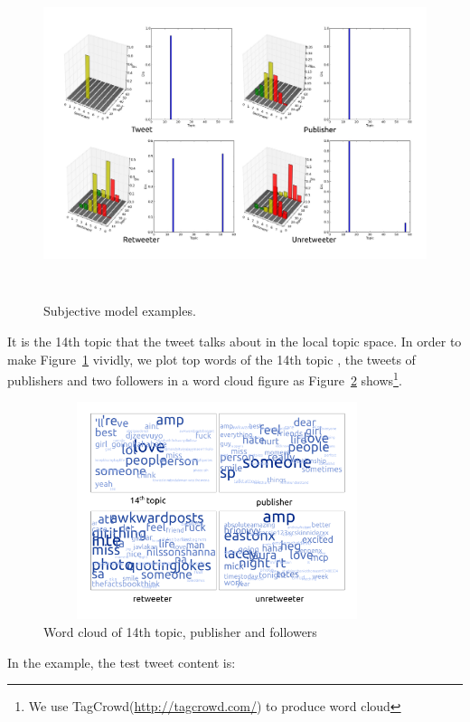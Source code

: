 \documentclass[preprint]{elsarticle}
\begin{document}
\begin{figure}[htb]
\setlength{\belowcaptionskip}{-0.2cm} 
\centering%
\includegraphics[width=6.0in,height=3.8in]{tweets10.pdf}
\vspace{-4em}\caption{Subjective model examples.}
\label{fig:graph4}
\end{figure}
It is the 14th topic that the tweet talks about in the local topic space.
In order to make Figure~\ref{fig:graph4} vividly, we plot top words of the 14th topic , the tweets of publishers and two followers in a word cloud figure as Figure~\ref{fig:graph5} shows\footnote{We use TagCrowd(\url{http://tagcrowd.com/}) to produce word cloud}.
\begin{figure}[htb]
\setlength{\belowcaptionskip}{-0.2cm} 
\centering
\includegraphics[width=4.0in,height=2.5in]{text_cloud.pdf}
\vspace{-3em}\caption{Word cloud of 14th topic, publisher and followers}
\label{fig:graph5}
\end{figure}
In the example, the test tweet content is:\\
\end{document}
